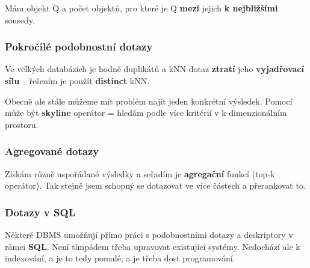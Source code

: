 Mám objekt Q a počet objektů, pro které je Q \textbf{mezi} jejich \textbf{k nejbližšími} sousedy.

\subsubsection{Pokročilé podobnostní dotazy}

Ve velkých databázích je hodně duplikátů a kNN dotaz \textbf{ztratí} jeho \textbf{vyjadřovací sílu} -- řešením je použít \textbf{distinct} kNN.

Obecně ale stále můžeme mít problém najít jeden konkrétní výsledek. Pomocí může být \textbf{skyline} operátor = hledám podle více kritérií v k-dimenzionálním prostoru.

\subsubsection{Agregované dotazy}

Získám různě uspořádané výsledky a seřadím je \textbf{agregační} funkcí (top-k operátor). Tak stejně jsem schopný se dotazovat ve více částech a přerankovat to.

\subsubsection{Dotazy v SQL}

Některé DBMS umožňují přímo práci s podobnostními dotazy a deskriptory v rámci \textbf{SQL}. Není tímpádem třeba upravovat existující systémy. Nedochází ale k indexování, a je to tedy pomalé, a je třeba dost programování.
